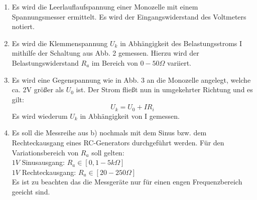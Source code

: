 \begin{enumerate}
    \item Es wird die Leerlauflaufspannung einer Monozelle mit einem Spannungsmesser ermittelt.
    Es wird der Eingangswiderstand des Voltmeters notiert.

    \item Es wird die Klemmenspannung $U_k$ in Abhängigkeit des Belastungsstroms I mithilfe
    der Schaltung aus Abb. 2 gemessen.
    Hierzu wird der Belastungswiderstand $R_a$ im Bereich von $ 0-50 \Omega$ variiert.

    \item Es wird eine Gegenspannung wie in Abb. 3 an die Monozelle angelegt, welche ca. 2V
    größer als $U_0$ ist. Der Strom fließt nun in umgekehrter Richtung und es gilt:
    \begin{equation}
	    U_k = U_0 + IR_i
    \end{equation}
    Es wird wiederum $U_k$ in Abhängigkeit von I gemessen.

    \item Es soll die Messreihe aus b) nochmals mit dem Sinus bzw. dem
    Rechteckausgang eines RC-Generators durchgeführt werden. Für den Variationsbereich
    von $R_a$ soll gelten:\\
    $1 V$ Sinusausgang: $R_a \in [0,1 - 5 k\Omega]$\\
    $1 V$ Rechteckausgang: $R_a \in [20 -250 \Omega]$\\
    Es ist zu beachten das die Messgeräte nur für einen engen Frequenzbereich geeicht sind.
\end{enumerate}
